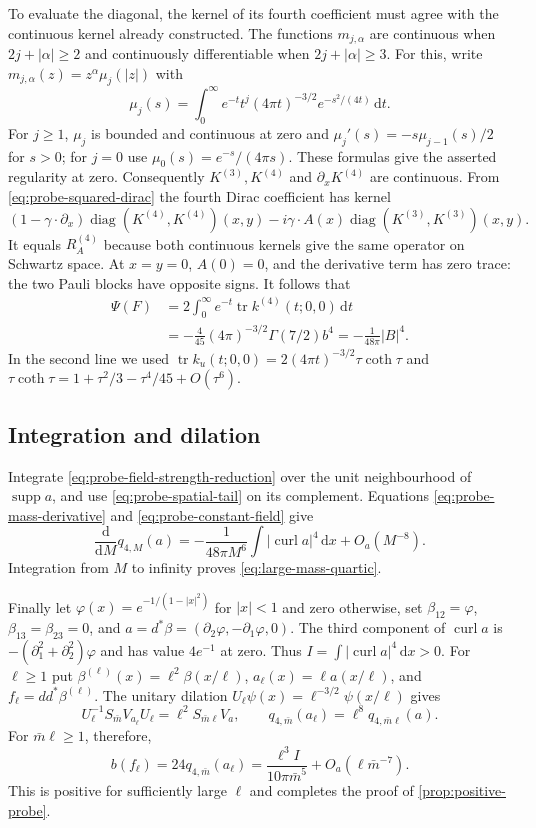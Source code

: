 \documentclass[11pt,letterpaper,reqno]{amsart}
\newcommand{\dd}{\mathrm d}
\DeclareMathOperator{\supp}{supp}
\DeclareMathOperator{\tr}{tr}
\DeclareMathOperator{\diag}{diag}
\begin{document}
To evaluate the diagonal, the kernel of its fourth coefficient must
agree with the continuous kernel already constructed. The functions
$m_{j,\alpha}$ are continuous when $2j+|\alpha|\ge2$ and continuously
differentiable when $2j+|\alpha|\ge3$. For this, write
$m_{j,\alpha}(z)=z^\alpha\mu_j(|z|)$ with
\[
 \mu_j(s)=\int_0^\infty e^{-t}t^j(4\pi t)^{-3/2}e^{-s^2/(4t)}\,\dd t.
\]
For $j\ge1$, $\mu_j$ is bounded and continuous at zero and
$\mu_j'(s)=-s\mu_{j-1}(s)/2$ for $s>0$; for $j=0$ use
$\mu_0(s)=e^{-s}/(4\pi s)$. These formulas give the asserted
regularity at zero. Consequently $K^{(3)},K^{(4)}$ and
$\partial_xK^{(4)}$ are continuous. From
\eqref{eq:probe-squared-dirac} the fourth Dirac coefficient has kernel
\[
 (1-\gamma\cdot\partial_x)\diag(K^{(4)},K^{(4)})(x,y)
       -i\gamma\cdot A(x)\diag(K^{(3)},K^{(3)})(x,y).
\]
It equals $R_A^{(4)}$ because both continuous kernels give the same
operator on Schwartz space. At $x=y=0$, $A(0)=0$, and the derivative
term has zero trace: the two Pauli blocks have opposite signs.
It follows that
\begin{align}
 \Psi(F)&=2\int_0^\infty e^{-t}\tr k^{(4)}(t;0,0)\,\dd t\\
 &=-\frac4{45}(4\pi)^{-3/2}\Gamma(7/2)b^4
   =-\frac1{48\pi}|B|^4.\label{eq:probe-constant-field}
\end{align}
In the second line we used
$\tr k_u(t;0,0)=2(4\pi t)^{-3/2}\tau\coth\tau$ and
$\tau\coth\tau=1+\tau^2/3-\tau^4/45+O(\tau^6)$.

\subsection{Integration and dilation}

Integrate \eqref{eq:probe-field-strength-reduction} over the unit
neighbourhood of $\supp a$, and use \eqref{eq:probe-spatial-tail}
on its complement. Equations \eqref{eq:probe-mass-derivative} and
\eqref{eq:probe-constant-field} give
\[
 \frac{\dd}{\dd M}q_{4,M}(a)
 =-\frac1{48\pi M^6}\int|\operatorname{curl}a|^4\,\dd x
                                    +O_a(M^{-8}).
\]
Integration from $M$ to infinity proves
\eqref{eq:large-mass-quartic}.

Finally let $\varphi(x)=e^{-1/(1-|x|^2)}$ for $|x|<1$ and zero
otherwise, set $\beta_{12}=\varphi$, $\beta_{13}=\beta_{23}=0$, and
$a=d^*\beta=(\partial_2\varphi,-\partial_1\varphi,0)$.
The third component of $\operatorname{curl}a$ is
$-(\partial_1^2+\partial_2^2)\varphi$ and has value $4e^{-1}$ at zero.
Thus $I=\int|\operatorname{curl}a|^4\,\dd x>0$.
For $\ell\ge1$ put
$\beta^{(\ell)}(x)=\ell^2\beta(x/\ell)$,
$a_\ell(x)=\ell a(x/\ell)$, and $f_\ell=dd^*\beta^{(\ell)}$.
The unitary dilation $U_\ell\psi(x)=\ell^{-3/2}\psi(x/\ell)$ gives
\[
 U_\ell^{-1}S_{\bar m}V_{a_\ell}U_\ell
       =\ell^2S_{\bar m\ell}V_a,
 \qquad q_{4,\bar m}(a_\ell)=\ell^8q_{4,\bar m\ell}(a).
\]
For $\bar m\ell\ge1$, therefore,
\begin{equation}\label{eq:probe-positive-dilation}
 b(f_\ell)=24q_{4,\bar m}(a_\ell)
   =\frac{\ell^3I}{10\pi\bar m^5}
                      +O_a(\ell\bar m^{-7}).
\end{equation}
This is positive for sufficiently large $\ell$ and completes the proof
of \cref{prop:positive-probe}.
\end{document}
